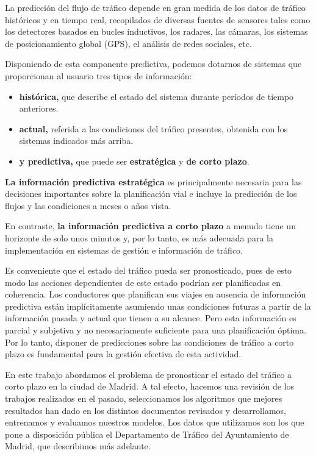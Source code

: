 \documentclass[]{book}
\providecommand{\tightlist}{%
  \setlength{\itemsep}{0pt}\setlength{\parskip}{0pt}}
\begin{document}
La predicción del flujo de tráfico depende en gran medida de los datos
de tráfico históricos y en tiempo real, recopilados de diversas fuentes
de sensores tales como los detectores basados en bucles inductivos, los
radares, las cámaras, los sistemas de posicionamiento global (GPS), el
análisis de redes sociales, etc.

Disponiendo de esta componente predictiva, podemos dotarnos de sistemas
que proporcionan al usuario tres tipos de información:

\begin{itemize}
\tightlist
\item
  \textbf{histórica,} que describe el estado del sistema durante
  períodos de tiempo anteriores.
\item
  \textbf{actual,} referida a las condiciones del tráfico presentes,
  obtenida con los sistemas indicados más arriba.
\item
  \textbf{y predictiva,} que puede ser \textbf{estratégica} y \textbf{de
  corto plazo}.
\end{itemize}

\textbf{La información predictiva estratégica} es principalmente
necesaria para las decisiones importantes sobre la planificación vial e
incluye la predicción de los flujos y las condiciones a meses o años
vista.

En contraste, \textbf{la información predictiva a corto plazo} a menudo
tiene un horizonte de solo unos minutos y, por lo tanto, es más adecuada
para la implementación en sistemas de gestión e información de tráfico.

Es conveniente que el estado del tráfico pueda ser pronosticado, pues de
esto modo las acciones dependientes de este estado podrían ser
planificadas en coherencia. Los conductores que planifican sus viajes en
ausencia de información predictiva están implícitamente asumiendo unas
condiciones futuras a partir de la información pasada y actual que
tienen a su alcance. Pero esta información es parcial y subjetiva y no
necesariamente suficiente para una planificación óptima. Por lo tanto,
disponer de predicciones sobre las condiciones de tráfico a corto plazo
es fundamental para la gestión efectiva de esta actividad.

En este trabajo abordamos el problema de pronosticar el estado del
tráfico a corto plazo en la ciudad de Madrid. A tal efecto, hacemos una
revisión de los trabajos realizados en el pasado, seleccionamos los
algoritmos que mejores resultados han dado en los distintos documentos
revisados y desarrollamos, entrenamos y evaluamos nuestros modelos. Los
datos que utilizamos son los que pone a disposición pública el
Departamento de Tráfico del Ayuntamiento de Madrid, que describimos más
adelante.
\end{document}
